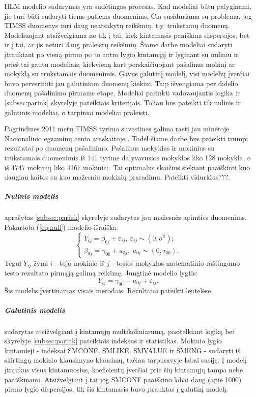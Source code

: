 \documentclass[12pt,a4paper]{article}
\begin{document}
\indent HLM modelio sudarymas yra sudėtingas procesas. Kad modeliai būtų palyginami, jie turi būti sudaryti tiems patiems duomenims. Čia susiduriama su problema, jog TIMSS duomenys turi daug neatsakytų reikšmių, t.y. trūkstamų duomenų. Modeliuojant atsižvelgiama ne tik į tai, kiek kintamasis paaiškina dispersijos, bet ir į tai, ar jis neturi daug praleistų reikšmių. Šiame darbe modeliai sudaryti įtraukiant po vieną pirmo po to antro lygio kintamąjį ir lyginant su nuliniu ir prieš tai gautu modeliais, kiekvieną kart perskaičiuojant pašalinus mokinį ar mokyklą su trūkstamais duomenimis. Gavus galutinį modelį, visi modelių įverčiai buvo pervertinti jau galutiniam duomenų kiekiui. Taip išvengiama per didelio duomenų pašalinimo pirmame etape. Modeliai parinkti vadovaujantis logika ir \ref{subsec:parink} skyrelyje pateiktais kriterijais. Toliau bus pateikti tik nulinis ir galutinis modeliai, o tarpiniai modeliai praleisti.

\indent Pagrindines 2011 metų TIMSS tyrimo suvestines galima rasti jau minėtoje Nacionalinio egzaminų cento ataskaitoje \cite{timss2011lt}. Todėl šiame darbe bus pateikti trumpi rezultatai po duomenų pašalinimo. Pašalinus mokyklas ir mokinius su trūkstamais duomenimis iš 141 tyrime dalyvavusios mokyklos liko 128 mokykla, o iš 4747 mokinių liko 4167 mokiniai. Tai optimalus skaičius siekiant paaiškinti kuo daugiau kaitos su kuo mažesniu mokinių praradimu. Pateikti vidurkius???.

\subparagraph{Nulinis modelis} aprašytas \ref{subsec:parink} skyrelyje sudarytas jau mažesnės apimties duomenims. Pakartota (\ref{eq:null}) modelio išraiška:
\begin{equation}
\left\{
\begin{array}{l}
Y_{ij}=\beta_{0j}+\varepsilon_{ij}, \ \varepsilon_{ij}\sim (0, \sigma^2);\\
\beta_{0j}=\gamma_{00}+u_{0j}, \ u_{0j}\sim (0, \tau_{00}).
\end{array} \right.
\end{equation}
Tegul $Y_{ij}$ žymi $i$ - tojo mokinio iš $j$ - tosios mokyklos matematinio raštingumo testo rezultato pirmąją galimą reikšmę. Jungtinė modelio lygtis:
\[
Y_{ij}=\gamma_{00}+u_{0j}+\varepsilon_{ij}.
\]
Šis modelis įvertinamas visais metodais. Rezultatai pateikti lentelėse.

\subparagraph{Galutinis modelis} sudarytas atsižvelgiant į kintamųjų multikoliniarumą, pasitelkiant logiką bei skyrelyje \ref{subsec:parink} pateiktais indeksus ir statistikas. Mokinio lygio kintamieji - indeksai SMCONF, SMLIKE, SMVALUE ir SMENG - sudaryti iš skirtingų mokinio klausimyno klausimų, tačiau tarpusavyje labai susiję. Į modelį įtraukus visus kintamuosius, koeficientų įverčiai prie šių kintamųjų tampa nebe paaiškinami. Atsižvelgiant į tai jog SMCONF paaiškino labai daug (apie 1000) pirmo lygio dispersijos, tik šis kintamasis buvo įtrauktas į galutinį modelį.
\end{document}
